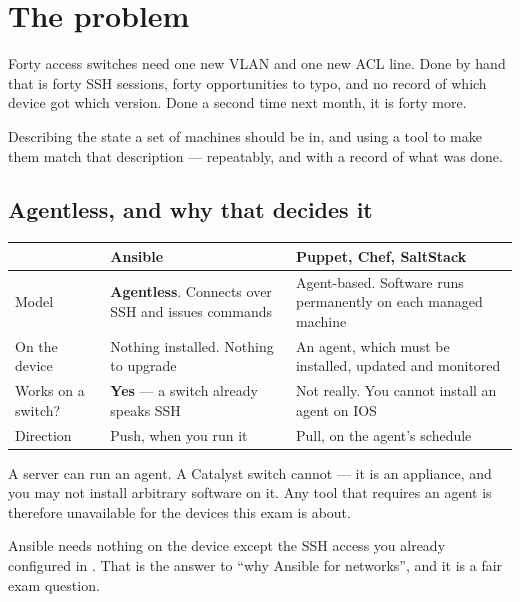 \section{The problem}

Forty access switches need one new VLAN and one new ACL line. Done by hand that
is forty SSH sessions, forty opportunities to typo, and no record of which
device got which version. Done a second time next month, it is forty more.

\begin{definitionbox}
Describing the state a set of machines should be in, and using a tool to make
them match that description --- repeatably, and with a record of what was done.
\end{definitionbox}

\subsection{Agentless, and why that decides it}

\begin{longtable}{@{}L{3.3cm}L{5.6cm}L{6.2cm}@{}}
\toprule
{}
\textbf{} & \textbf{Ansible} & \textbf{Puppet, Chef, SaltStack} \\
\midrule
\endhead
Model & \textbf{Agentless}. Connects over SSH and issues commands &
Agent-based. Software runs permanently on each managed machine \\
On the device & Nothing installed. Nothing to upgrade &
An agent, which must be installed, updated and monitored \\
Works on a switch? & \textbf{Yes} --- a switch already speaks SSH &
Not really. You cannot install an agent on IOS \\
Direction & Push, when you run it & Pull, on the agent's schedule \\
\bottomrule
\end{longtable}

\begin{alertbox}
A server can run an agent. A Catalyst switch cannot --- it is an appliance, and
you may not install arbitrary software on it. Any tool that requires an agent is
therefore unavailable for the devices this exam is about.

Ansible needs nothing on the device except the SSH access you already configured
in . That is the answer to ``why Ansible for networks'', and it is a
fair exam question.
\end{alertbox}

